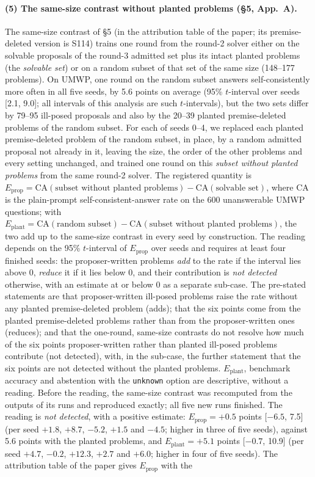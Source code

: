 \documentclass[10pt,a4paper]{article}
\newcommand{\unk}{\texttt{unknown}}
\begin{document}
\paragraph{(5) The same-size contrast without planted problems (\S5, App.~A).} The same-size contrast of \S5 (in the attribution table of the paper; its premise-deleted version is S114) trains one round from the round-2 solver either on the solvable proposals of the round-3 admitted set plus its intact planted problems (the \emph{solvable set}) or on a random subset of that set of the same size (148--177 problems). On UMWP, one round on the random subset answers self-consistently more often in all five seeds, by 5.6 points on average (95\% $t$-interval over seeds [2.1, 9.0]; all intervals of this analysis are such $t$-intervals), but the two sets differ by 79--95 ill-posed proposals and also by the 20--39 planted premise-deleted problems of the random subset. For each of seeds 0--4, we replaced each planted premise-deleted problem of the random subset, in place, by a random admitted proposal not already in it, leaving the size, the order of the other problems and every setting unchanged, and trained one round on this \emph{subset without planted problems} from the same round-2 solver. The registered quantity is $E_{\mathrm{prop}} = \mathrm{CA}(\text{subset without planted problems}) - \mathrm{CA}(\text{solvable set})$, where CA is the plain-prompt self-consistent-answer rate on the 600 unanswerable UMWP questions; with $E_{\mathrm{plant}} = \mathrm{CA}(\text{random subset}) - \mathrm{CA}(\text{subset without planted problems})$, the two add up to the same-size contrast in every seed by construction. The reading depends on the 95\% $t$-interval of $E_{\mathrm{prop}}$ over seeds and requires at least four finished seeds: the proposer-written problems \emph{add} to the rate if the interval lies above 0, \emph{reduce} it if it lies below 0, and their contribution is \emph{not detected} otherwise, with an estimate at or below 0 as a separate sub-case. The pre-stated statements are that proposer-written ill-posed problems raise the rate without any planted premise-deleted problem (adds); that the six points come from the planted premise-deleted problems rather than from the proposer-written ones (reduces); and that the one-round, same-size contrasts do not resolve how much of the six points proposer-written rather than planted ill-posed problems contribute (not detected), with, in the sub-case, the further statement that the six points are not detected without the planted problems. $E_{\mathrm{plant}}$, benchmark accuracy and abstention with the \unk{} option are descriptive, without a reading. Before the reading, the same-size contrast was recomputed from the outputs of its runs and reproduced exactly; all five new runs finished. The reading is \emph{not detected}, with a positive estimate: $E_{\mathrm{prop}} = +0.5$ points [$-6.5$, 7.5] (per seed $+1.8$, $+8.7$, $-5.2$, $+1.5$ and $-4.5$; higher in three of five seeds), against 5.6 points with the planted problems, and $E_{\mathrm{plant}} = +5.1$ points [$-0.7$, 10.9] (per seed $+4.7$, $-0.2$, $+12.3$, $+2.7$ and $+6.0$; higher in four of five seeds). The attribution table of the paper gives $E_{\mathrm{prop}}$ with the 
\end{document}
